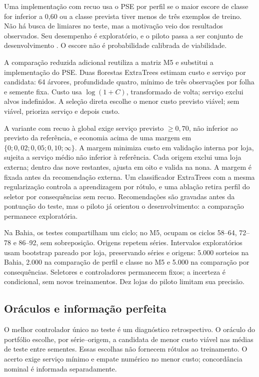\documentclass[preprint,12pt]{elsarticle}
\begin{document}
Uma implementação com recuo usa o PSE por perfil se o maior escore de classe for inferior a 0,60 ou a classe prevista tiver menos de três exemplos de treino. Não há busca de limiares no teste, mas a motivação veio dos resultados observados. Seu desempenho é exploratório, e o piloto passa a ser conjunto de desenvolvimento \cite{CawleyTalbot2010}. O escore não é probabilidade calibrada de viabilidade.

A comparação reduzida adicional reutiliza a matriz M5 e substitui a implementação do PSE. Duas florestas ExtraTrees estimam custo e serviço por candidata: 64 árvores, profundidade quatro, mínimo de três observações por folha e semente fixa. Custo usa $\log(1+C)$, transformado de volta; serviço exclui alvos indefinidos. A seleção direta escolhe o menor custo previsto viável; sem viável, prioriza serviço e depois custo.

A variante com recuo à global exige serviço previsto $\geq0{,}70$, não inferior ao previsto da referência, e economia acima de uma margem em $\{0;0{,}02;0{,}05;0{,}10;\infty\}$. A margem minimiza custo em validação interna por loja, sujeita a serviço médio não inferior à referência. Cada origem exclui uma loja externa; dentro das nove restantes, ajusta em oito e valida na nona. A margem é fixada antes da recomendação externa. Um classificador ExtraTrees com a mesma regularização controla a aprendizagem por rótulo, e uma ablação retira perfil do seletor por consequências sem recuo. Recomendações são gravadas antes da pontuação do teste, mas o piloto já orientou o desenvolvimento: a comparação permanece exploratória.

Na Bahia, os testes compartilham um ciclo; no M5, ocupam os ciclos 58--64, 72--78 e 86--92, sem sobreposição. Origens repetem séries. Intervalos exploratórios usam bootstrap pareado por loja, preservando séries e origens: 5.000 sorteios na Bahia, 2.000 na comparação de perfil e classe no M5 e 5.000 na comparação por consequências. Seletores e controladores permanecem fixos; a incerteza é condicional, sem novos treinamentos. Dez lojas do piloto limitam sua precisão.

\subsection{Oráculos e informação perfeita}
O melhor controlador único no teste é um diagnóstico retrospectivo. O oráculo do portfólio escolhe, por série--origem, a candidata de menor custo viável nas médias de teste entre sementes. Essas escolhas não fornecem rótulos ao treinamento. O acerto exige serviço mínimo e empate numérico no menor custo; concordância nominal é informada separadamente.
\end{document}
